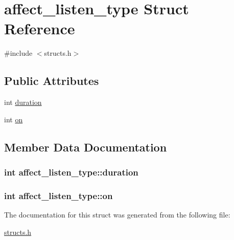 \hypertarget{structaffect__listen__type}{\section{affect\-\_\-listen\-\_\-type Struct Reference}
\label{structaffect__listen__type}
}


{\ttfamily \#include $<$structs.\-h$>$}

\subsection*{Public Attributes}
\begin{DoxyCompactItemize}
\item 
int \hyperlink{structaffect__listen__type_a3e2a072afdf608dadf85d0268c3bbedc}{duration}
\item 
int \hyperlink{structaffect__listen__type_a2702c90f48713420f36448b9df5581d9}{on}
\end{DoxyCompactItemize}


\subsection{Member Data Documentation}
\hypertarget{structaffect__listen__type_a3e2a072afdf608dadf85d0268c3bbedc}{
\subsubsection[{duration}]{\setlength{\rightskip}{0pt plus 5cm}int affect\-\_\-listen\-\_\-type\-::duration}}\label{structaffect__listen__type_a3e2a072afdf608dadf85d0268c3bbedc}
\hypertarget{structaffect__listen__type_a2702c90f48713420f36448b9df5581d9}{
\subsubsection[{on}]{\setlength{\rightskip}{0pt plus 5cm}int affect\-\_\-listen\-\_\-type\-::on}}\label{structaffect__listen__type_a2702c90f48713420f36448b9df5581d9}


The documentation for this struct was generated from the following file\-:\begin{DoxyCompactItemize}
\item 
\hyperlink{structs_8h}{structs.\-h}\end{DoxyCompactItemize}
